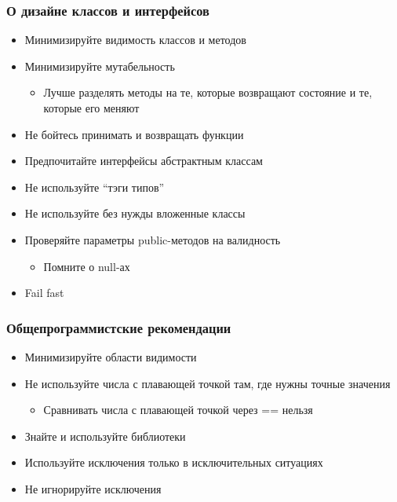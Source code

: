\documentclass[xetex,mathserif,serif]{beamer}
\begin{document}
	\begin{frame}
		\frametitle{О дизайне классов и интерфейсов}
		\begin{itemize}
			\item Минимизируйте видимость классов и методов
			\item Минимизируйте мутабельность
			\begin{itemize}
				\item Лучше разделять методы на те, которые возвращают состояние и те, которые его меняют
			\end{itemize}
			\item Не бойтесь принимать и возвращать функции
			\item Предпочитайте интерфейсы абстрактным классам
			\item Не используйте ``тэги типов''
			\item Не используйте без нужды вложенные классы
			\item Проверяйте параметры public-методов на валидность
			\begin{itemize}
				\item Помните о null-ах
			\end{itemize}
			\item Fail fast
		\end{itemize}
	\end{frame}

	\begin{frame}
		\frametitle{Общепрограммистские рекомендации}
		\begin{itemize}
			\item Минимизируйте области видимости
			\item Не используйте числа с плавающей точкой там, где нужны точные значения
			\begin{itemize}
				\item Сравнивать числа с плавающей точкой через == нельзя
			\end{itemize}
			\item Знайте и используйте библиотеки
			\item Используйте исключения только в исключительных ситуациях
			\item Не игнорируйте исключения
		\end{itemize}
	\end{frame}
\end{document}
